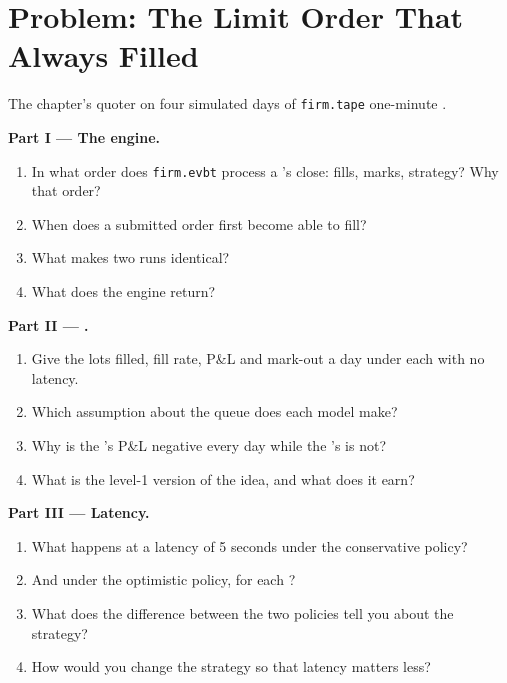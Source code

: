 \section{Problem: The Limit Order That Always Filled}

\begin{problem}\label{pb:rs:event-driven-backtests:1}
The chapter's quoter on four simulated days of \texttt{firm.tape} one-minute .

\medskip\noindent\textbf{Part I --- The engine.}
\begin{enumerate}
\item In what order does \texttt{firm.evbt} process a 's close: fills, marks, strategy? Why that order?
\item When does a submitted order first become able to fill?
\item What makes two runs identical?
\item What does the engine return?
\end{enumerate}

\medskip\noindent\textbf{Part II --- .}
\begin{enumerate}[resume]
\item Give the lots filled, fill rate, P\&L and mark-out a day under each  with no latency.
\item Which assumption about the queue does each model make?
\item Why is the 's P\&L negative every day while the 's is not?
\item What is the level-1 version of the idea, and what does it earn?
\end{enumerate}

\medskip\noindent\textbf{Part III --- Latency.}
\begin{enumerate}[resume]
\item What happens at a latency of 5 seconds under the conservative policy?
\item And under the optimistic policy, for each ?
\item What does the difference between the two policies tell you about the strategy?
\item How would you change the strategy so that latency matters less?
\end{enumerate}


\end{problem}
